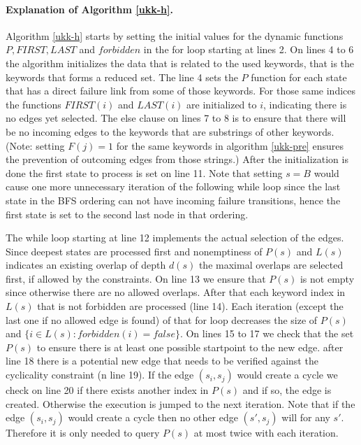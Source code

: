 \documentclass[english,twoside,censored,csm,algorithms-track-2020]{HYthesisML}
\theoremstyle{plain}
\theoremstyle{definition}
\begin{document}
\paragraph{Explanation of Algorithm \ref{ukk-h}.}
Algorithm \ref{ukk-h} starts by setting the initial values for the dynamic functions
$P, FIRST, LAST$ and $forbidden$ in the for loop starting at lines 2. On lines 4 to 6 the algorithm
initializes the data that is related to the used keywords, that is the keywords that forms a reduced set.
The line 4 sets the $P$ function for each state that has a direct failure link from some of
those keywords. For those same indices the functions $FIRST(i)$ and $LAST(i)$ are initialized
to $i$, indicating there is no edges yet selected. The else clause on lines 7 to 8 is
to ensure that there will be no incoming edges to the keywords that are substrings of other
keywords. (Note: setting $F(j) = 1$ for the same keywords in algorithm \ref{ukk-pre} ensures
the prevention of outcoming edges from those strings.) After the initialization is done the
first state to process is set on line 11. Note that setting $s=B$ would cause one more unnecessary
iteration of the following while loop since the last state in the BFS ordering can not have
incoming failure transitions, hence the first state is set to the second last node in that
ordering.

The while loop starting at line 12 implements the actual selection of the edges. Since
deepest states are processed first and nonemptiness of $P(s)$ and $L(s)$ indicates an existing
overlap of depth $d(s)$ the maximal overlaps are selected first, if allowed by the constraints.
On line 13 we ensure that $P(s)$ is not empty since otherwise there are no allowed overlaps.
After that each keyword index in $L(s)$ that is not forbidden are processed (line 14). Each
iteration (except the last one if no allowed edge is found) of that for loop decreases the
size of $P(s)$ and $\{i\in L(s) : forbidden(i) = false\}$. On lines 15 to 17 we check that
the set $P(s)$ to ensure there is at least one possible startpoint to the new edge. after line 18
there is a potential new edge that needs to be verified against the cyclicality constraint
(n line 19). If the edge $(s_i,s_j)$ would create a cycle we check on line 20 if there exists
another index in $P(s)$ and if so, the edge is created. Otherwise the execution is jumped to the
next iteration. Note that if the edge $(s_i,s_j)$ would create a cycle then no other edge $(s',s_j)$
will for any $s'$. Therefore it is only needed to query $P(s)$ at most twice with each iteration.
\end{document}
